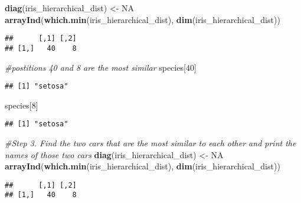 \documentclass[11pt,]{article}
\newenvironment{Shaded}{\begin{snugshade}}{\end{snugshade}}
\newcommand{\CommentTok}[1]{\textcolor[rgb]{0.56,0.35,0.01}{\textit{#1}}}
\newcommand{\DecValTok}[1]{\textcolor[rgb]{0.00,0.00,0.81}{#1}}
\newcommand{\KeywordTok}[1]{\textcolor[rgb]{0.13,0.29,0.53}{\textbf{#1}}}
\newcommand{\NormalTok}[1]{#1}
\newcommand{\OtherTok}[1]{\textcolor[rgb]{0.56,0.35,0.01}{#1}}
\newcommand{\StringTok}[1]{\textcolor[rgb]{0.31,0.60,0.02}{#1}}
\begin{document}
\begin{Shaded}
\begin{Highlighting}[]
\KeywordTok{diag}\NormalTok{(iris_hierarchical_dist) <-}\StringTok{ }\OtherTok{NA}
\KeywordTok{arrayInd}\NormalTok{(}\KeywordTok{which.min}\NormalTok{(iris_hierarchical_dist), }\KeywordTok{dim}\NormalTok{(iris_hierarchical_dist))}
\end{Highlighting}
\end{Shaded}

\begin{verbatim}
##      [,1] [,2]
## [1,]   40    8
\end{verbatim}

\begin{Shaded}
\begin{Highlighting}[]
\CommentTok{#postitions 40 and 8 are the most similar}
\NormalTok{species[}\DecValTok{40}\NormalTok{]}
\end{Highlighting}
\end{Shaded}

\begin{verbatim}
## [1] "setosa"
\end{verbatim}

\begin{Shaded}
\begin{Highlighting}[]
\NormalTok{species[}\DecValTok{8}\NormalTok{]}
\end{Highlighting}
\end{Shaded}

\begin{verbatim}
## [1] "setosa"
\end{verbatim}

\begin{Shaded}
\begin{Highlighting}[]
\CommentTok{#Step 3. Find the two cars that are the most similar to each other and print the names of those two cars}
\KeywordTok{diag}\NormalTok{(iris_hierarchical_dist) <-}\StringTok{ }\OtherTok{NA}
\KeywordTok{arrayInd}\NormalTok{(}\KeywordTok{which.min}\NormalTok{(iris_hierarchical_dist), }\KeywordTok{dim}\NormalTok{(iris_hierarchical_dist))}
\end{Highlighting}
\end{Shaded}

\begin{verbatim}
##      [,1] [,2]
## [1,]   40    8
\end{verbatim}
\end{document}
